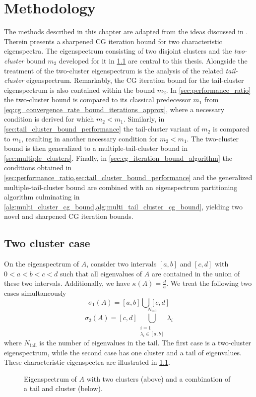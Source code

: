 \chapter{Methodology}\label{ch:methods}
The methods described in this chapter are adapted from the ideas discussed in \cite[Section 4]{cg_sharpened_convrate_Axelsson1976}. Therein \citeauthor{cg_sharpened_convrate_Axelsson1976} presents a sharpened CG iteration bound for two characteristic eigenspectra. The eigenspectrum consisting of two disjoint clusters and the \textit{two-cluster} bound $m_2$ developed for it in \cref{sec:cg_sharpened_convrate} are central to this thesis. Alongside the treatment of the two-cluster eigenspectrum is the analysis of the related \textit{tail-cluster} eigenspectrum. Remarkably, the CG iteration bound for the tail-cluster eigenspectrum is also contained within the bound $m_2$. In \cref{sec:performance_ratio} the two-cluster bound is compared to its classical predecessor $m_1$ from \cref{eq:cg_convergence_rate_bound_iterations_approx}, where a necessary condition is derived for which $m_2 < m_1$. Similarly, in \cref{sec:tail_cluster_bound_performance} the tail-cluster variant of $m_2$ is compared to $m_1$, resulting in another necessary condition for $m_2 < m_1$. The two-cluster bound is then generalized to a multiple-tail-cluster bound in \cref{sec:multiple_clusters}. Finally, in \cref{sec:cg_iteration_bound_algorithm} the conditions obtained in \cref{sec:performance_ratio,sec:tail_cluster_bound_performance} and the generalized multiple-tail-cluster bound are combined with an eigenspectrum partitioning algorithm culminating in \cref{alg:multi_cluster_cg_bound,alg:multi_tail_cluster_cg_bound}, yielding two novel and sharpened CG iteration bounds.

\section{Two cluster case}\label{sec:cg_sharpened_convrate}
On the eigenspectrum of $A$, consider two intervals $[a, b]$ and $[c, d]$ with $0 < a < b < c < d$ such that all eigenvalues of $A$ are contained in the union of these two intervals. Additionally, we have $\kappa(A) = \frac{d}{a}$. We treat the following two cases simultaneously
\begin{equation}
    \sigma_1(A) = [a,b] \bigcup [c,d]
    \label{eq:two_clusters}
\end{equation}
\begin{equation}
    \sigma_2(A) = [c,d] \bigcup_{\substack{i=1 \\ \lambda_i \in [a,b]}}^{N_{\text{tail}}} \lambda_i
    \label{eq:one_cluster_with_tail}
\end{equation}
where $N_{\text{tail}}$ is the number of eigenvalues in the tail. The first case is a two-cluster eigenspectrum, while the second case has one cluster and a tail of eigenvalues. These characteristic eigenspectra are illustrated in \cref{fig:eigenvalue_clusters}.
\begin{figure}[H]
    \centering
    
    \caption{Eigenspectrum of $A$ with two clusters (above) and a combination of a tail and cluster (below).}
    \label{fig:eigenvalue_clusters}
\end{figure}

